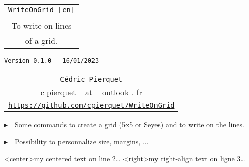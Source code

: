 \documentclass[a4paper]{article}
\def\TPversion{0.1.0}
\def\TPdate{16/01/2023}
\begin{document}
\pagestyle{fancy}

\thispagestyle{empty}

\vspace{2cm}

\begin{center}
	\begin{minipage}{0.75\linewidth}
	\begin{tcolorbox}[colframe=yellow,colback=yellow!15]
		\begin{center}
			\begin{tabular}{c}
				{\Huge \texttt{WriteOnGrid [en]}}\\
				\\
				{\LARGE To write on lines} \\
				{\LARGE of a grid.}
			\end{tabular}
			
			\medskip
			
			{\small \texttt{Version \TPversion{} -- \TPdate}}
		\end{center}
	\end{tcolorbox}
\end{minipage}
\end{center}

\vspace{0.5cm}

\begin{center}
	\begin{tabular}{c}
	\texttt{Cédric Pierquet}\\
	{\ttfamily c pierquet -- at -- outlook . fr}\\
	\texttt{\url{https://github.com/cpierquet/WriteOnGrid}}
\end{tabular}
\end{center}

\vspace{0.5cm}

{$\blacktriangleright$~~Some commands to create a grid (5x5 or Seyes) and to write \og on \fg{} the lines.}

\smallskip

{$\blacktriangleright$~~Possibility to personnalize size, margins, ...}

\vspace{1cm}

\begin{center}
	\begin{EnvGrid}[NumSquares=22x8]
	\WriteLine<center>{my centered text on line 2\ldots}
	\WriteLine<right>{my right-align text on ligne 3\ldots}
	\PassLine
\end{EnvGrid}
\end{center}
\end{document}
